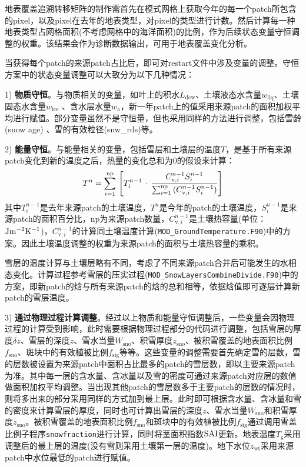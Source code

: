 地表覆盖追溯转移矩阵的制作需首先在模式网格上获取今年的每一个patch所包含的pixel，以及pixel在去年的地表类型，对pixel的类型进行计数。然后计算每一种地表类型占网格面积(不考虑网格中的海洋面积)的比例，作为后续状态变量守恒调整的权重。该结果会作为诊断数据输出，可用于地表覆盖变化分析。

当获得每个patch的来源patch占比后，即可对restart文件中涉及变量的调整。守恒方案中的状态变量调整可以大致分为以下几种情况：


1) \textbf{物质守恒}。与物质相关的变量，如叶上的积水$L_{\mathrm{dew}}$、土壤液态水含量$w_{\mathrm{liq}}$、土壤固态水含量$w_{\mathrm{ice}}$
、含水层水量$w_{\mathrm{a}}$，新一年patch上的值采用来源patch的面积加权平均进行赋值。部分变量虽然不是守恒量，但也采用同样的方法进行调整，包括雪龄 (snow age) 、雪的有效粒径(snw\_rds)等。

2) \textbf{能量守恒}。与能量相关的变量，包括雪层和土壤层的温度$T$，是基于所有来源patch变化到新的温度之后，热量的变化总和为0的假设来计算：
\begin{equation}
  T^{n} = \sum_{i = 1}^{\rm np}{\,\left[ T_{i}^{n - 1}\,\cdot\,\frac{C_{\mathrm{v},i}^{n - 1} S_{i}^{n - 1}}{\sum_{i = 1}^{\rm np}{(C_{\mathrm{v},i}^{n - 1} S_{i}^{n - 1})}}\right]}
\end{equation}
其中\(T_{i}^{n - 1}\)是去年来源patch的土壤温度，\(T^{n}\)是今年的patch的土壤温度，\(S_{i}^{n - 1}\)是来源patch的面积百分比，np为来源patch数量，\(C_{\mathrm{v},i}^{n - 1}\)是土壤热容量(单位：\( \rm Jm^{-2}K^{-1}\))，\(C_{\mathrm{v},i}^{n - 1}\)的计算同土壤温度计算(\texttt{MOD\_GroundTemperature.F90})中的方案。因此土壤温度调整的权重为来源patch的面积与土壤热容量的乘积。

雪层的温度计算与土壤层略有不同，考虑了不同来源patch合并后可能发生的水相态变化。计算过程参考雪层的压实过程(\texttt{MOD\_SnowLayersCombineDivide.F90})中的方案，即新patch的焓与所有来源patch的焓的总和相等，依据焓值即可逐层计算新patch的雪层温度。

3) \textbf{通过物理过程计算调整}。经过以上物质和能量守恒调整后，一些变量会因物理过程的计算受到影响，此时需要根据物理过程部分的代码进行调整，包括雪层的厚度$\delta z$、雪层的深度$z$、雪水当量$W_{\mathrm{sno}}$、积雪厚度$z_{\mathrm{sno}}$、被积雪覆盖的地表面积比例$f_{\mathrm{sno}}$、斑块中的有效植被比例$f_{\mathrm{sig}}$等等。这些变量的调整需要首先确定雪的层数，雪的层数被设置为来源patch中面积占比最多的patch的雪层数，即以主要来源patch为准。其中每一层的含水量、含冰量以及雪的密度可通过来源patch对应层的数值做面积加权平均调整。当出现其他patch的雪层数多于主要patch的层数的情况时，则将多出来的部分采用同样的方式加到最上层。此时即可根据含水量、含冰量和雪的密度来计算雪层的厚度，同时也可计算出雪层的深度$z$、雪水当量$W_{\mathrm{sno}}$和积雪厚度$z_{\mathrm{sno}}$。被积雪覆盖的地表面积比例$f_{\mathrm{sno}}$和斑块中的有效植被比例$f_{\mathrm{sig}}$通过调用雪盖比例子程序\texttt{snowfraction}进行计算，同时将茎面积指数$\rm SAI$更新。地表温度$T_{\mathrm{g}}$采用调整后的最上层的温度(没有雪则采用土壤第一层的温度)。地下水位$z_{\mathrm{wt}}$采用来源patch中水位最低的patch进行赋值。

